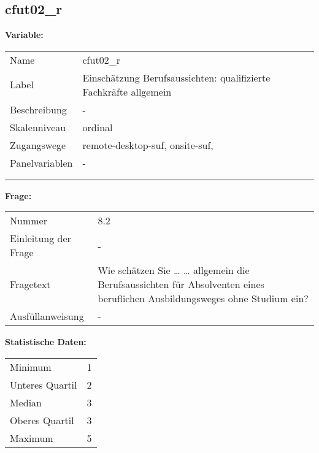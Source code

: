 	
	
	\subsection{cfut02\_r}
	\label{subSection:cfut02_r}

	\noindent\textbf{Variable:}\\
		\begin{tabular}{lL{11.3cm}}
			\label{tableVariable:cfut02_r}
			Name & cfut02\_r \\
			Label & Einschätzung Berufsaussichten: qualifizierte Fachkräfte allgemein \\
			Beschreibung & - \\
			Skalenniveau & ordinal \\
			Zugangswege &
				remote-desktop-suf,
				onsite-suf,
 \\
			Panelvariablen & -
			 \\
			 \\
 \\
		\end{tabular}

		\vspace*{1 cm}
		\noindent\textbf{Frage:}\\
		\begin{tabular}{lL{11.3cm}}
			\label{tableQuestion:cfut02_r}
			Nummer & 8.2 \\
			Einleitung der Frage & - \\
			Fragetext & Wie schätzen Sie …
… allgemein die Berufsaussichten für Absolventen eines beruflichen Ausbildungsweges ohne Studium ein? \\
			Ausfüllanweisung & - \\
		\end{tabular}


		\vspace*{1 cm}
		\noindent\textbf{Statistische Daten:}\\
			\begin{tabular}{ll}
				\label{tableStatistics:cfut02_r}
					Minimum & 1 \\
					Unteres Quartil & 2 \\
					Median & 3 \\
					Oberes Quartil & 3 \\
					Maximum & 5 \\
			\end{tabular}



